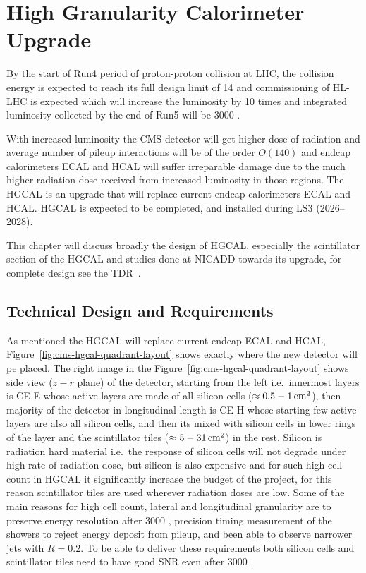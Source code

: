 \chapter{
  High Granularity Calorimeter Upgrade
 }\label{ch_hgcal}

By the start of Run4 period of proton-proton collision
at \gls{LHC}, the collision energy is expected to
reach its full design limit of 14 \TeV{} and
commissioning of \gls{HL-LHC} is expected which will
increase the luminosity by 10 times and
integrated luminosity collected by the end of Run5 will be 3000 \fbinv{}.

With increased luminosity the \gls{CMS} detector will get
higher dose of radiation and average number of pileup interactions
will be of the order \( O(140) \) and endcap calorimeters \gls{ECAL} and \gls{HCAL} will suffer
irreparable damage due to the much higher radiation dose received
from increased luminosity in those regions.
The \gls{HGCAL} is an upgrade that will replace current endcap calorimeters
\gls{ECAL} and \gls{HCAL}.
\gls{HGCAL} is expected to be completed, and installed
during \gls{LS3} (2026--2028).

This chapter will discuss broadly the design
of \gls{HGCAL}, especially the scintillator section of the \gls{HGCAL}
and studies done at \gls{NICADD} towards its upgrade,
for complete design see the \gls{TDR}~\cite{cms-hgcal-tdr}.

\section{
  Technical Design and Requirements
 }\label{ch_hgcal:technical-design}

As mentioned the \gls{HGCAL} will replace current endcap \gls{ECAL} and
\gls{HCAL}, Figure~\ref{fig:cms-hgcal-quadrant-layout}
shows exactly where the new detector will pe placed. The right image in the
Figure~\ref{fig:cms-hgcal-quadrant-layout} shows side view (\( z-r \) plane)
of the detector, starting from the left i.e.~innermost layers is
\gls{CE-E} whose active layers are made of all silicon cells
(\( \approx 0.5-1 \,\text{cm}{}^2\)), then
majority of the detector in longitudinal length is \gls{CE-H}
whose starting few active layers are also all silicon cells, and
then its mixed with silicon cells in lower rings of the
layer and the scintillator tiles (\( \approx 5-31 \,\text{cm}{}^2\)) in the rest.
Silicon is radiation hard material i.e.~the response of silicon cells
will not degrade under high rate of radiation dose, but
silicon is also expensive and for such high cell count in \gls{HGCAL}
it significantly increase the budget of the project, for this
reason scintillator tiles are used wherever radiation doses are low.
Some of the main reasons for high cell count, lateral and longitudinal granularity
are to preserve energy resolution after 3000 \fbinv{}, precision
timing measurement of the showers to reject energy deposit from pileup, and
been able to observe narrower jets with \( R = 0.2 \).
To be able to deliver these requirements both silicon cells and scintillator tiles
need to have good \gls{SNR} even after 3000 \fbinv{}.

